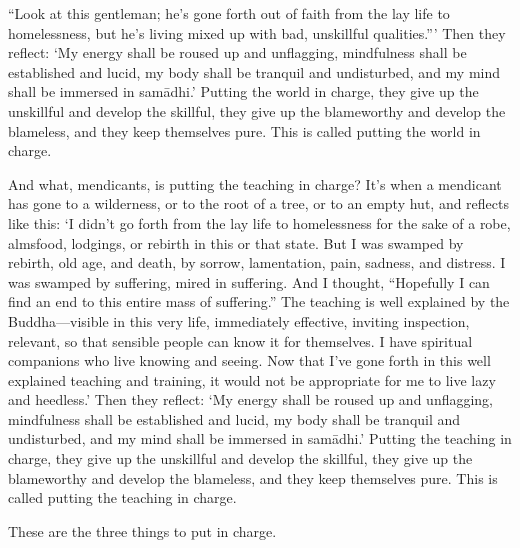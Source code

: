 \documentclass[12pt,openany]{book}%
\begin{document}
“Look at this gentleman; he’s gone forth out of faith from the lay life to homelessness, but he’s living mixed up with bad, unskillful qualities.”’ Then they reflect: ‘My energy shall be roused up and unflagging, mindfulness shall be established and lucid, my body shall be tranquil and undisturbed, and my mind shall be immersed in \textsanskrit{samādhi}.’ Putting the world in charge, they give up the unskillful and develop the skillful, they give up the blameworthy and develop the blameless, and they keep themselves pure. This is called putting the world in charge. 

And what, mendicants, is putting the teaching in charge? It’s when a mendicant has gone to a wilderness, or to the root of a tree, or to an empty hut, and reflects like this: ‘I didn’t go forth from the lay life to homelessness for the sake of a robe, almsfood, lodgings, or rebirth in this or that state. But I was swamped by rebirth, old age, and death, by sorrow, lamentation, pain, sadness, and distress. I was swamped by suffering, mired in suffering. And I thought, “Hopefully I can find an end to this entire mass of suffering.” The teaching is well explained by the Buddha—visible in this very life, immediately effective, inviting inspection, relevant, so that sensible people can know it for themselves. I have spiritual companions who live knowing and seeing. Now that I’ve gone forth in this well explained teaching and training, it would not be appropriate for me to live lazy and heedless.’ Then they reflect: ‘My energy shall be roused up and unflagging, mindfulness shall be established and lucid, my body shall be tranquil and undisturbed, and my mind shall be immersed in \textsanskrit{samādhi}.’ Putting the teaching in charge, they give up the unskillful and develop the skillful, they give up the blameworthy and develop the blameless, and they keep themselves pure. This is called putting the teaching in charge. 

These are the three things to put in charge. 
\end{document}
